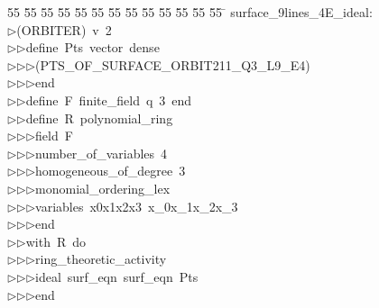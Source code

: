 %
%
\begin{tabbing}
55 \= 55 \= 55 \= 55 \= 55 \= 55 \= 55 \= 55 \= 55 \= 55 \= 55 \= 55 \= 55 \= \kill
surface\_9lines\_4E\_ideal:\\[0pt]
$\triangleright$\>(ORBITER)\ v\ 2\ \\[0pt]
$\triangleright$\>$\triangleright$\>define\ Pts\ vector\ dense\ \\[0pt]
$\triangleright$\>$\triangleright$\>$\triangleright$\>(PTS\_OF\_SURFACE\_ORBIT211\_Q3\_L9\_E4)\ \\[0pt]
$\triangleright$\>$\triangleright$\>$\triangleright$\>end\ \\[0pt]
$\triangleright$\>$\triangleright$\>define\ F\ finite\_field\ q\ 3\ end\ \\[0pt]
$\triangleright$\>$\triangleright$\>define\ R\ polynomial\_ring\ \\[0pt]
$\triangleright$\>$\triangleright$\>$\triangleright$\>field\ F\ \\[0pt]
$\triangleright$\>$\triangleright$\>$\triangleright$\>number\_of\_variables\ 4\ \\[0pt]
$\triangleright$\>$\triangleright$\>$\triangleright$\>homogeneous\_of\_degree\ 3\ \\[0pt]
$\triangleright$\>$\triangleright$\>$\triangleright$\>monomial\_ordering\_lex\ \\[0pt]
$\triangleright$\>$\triangleright$\>$\triangleright$\>variables\ x0x1x2x3\ x\_0x\_1x\_2x\_3\ \\[0pt]
$\triangleright$\>$\triangleright$\>$\triangleright$\>end\ \\[0pt]
$\triangleright$\>$\triangleright$\>with\ R\ do\ \\[0pt]
$\triangleright$\>$\triangleright$\>$\triangleright$\>ring\_theoretic\_activity\ \\[0pt]
$\triangleright$\>$\triangleright$\>$\triangleright$\>ideal\ surf\_eqn\ surf\_eqn\ Pts\ \\[0pt]
$\triangleright$\>$\triangleright$\>$\triangleright$\>end\ \\[0pt]
\end{tabbing}
